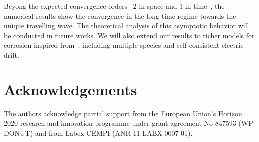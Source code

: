 \documentclass{amsart}
\begin{document}
Beyong the expected convergence orders --$2$ in space and $1$ in time--, the numerical results show the convergence in the long-time regime towards the unique travelling wave. The theoretical analysis of this asymptotic behavior will be conducted in future works. 
We will also extend our results  to richer models for corrosion inspired from~\cite{Bataillon_elec}, including multiple species and self-consistent electric drift. 

\section*{Acknowledgements} The authors acknowledge partial support from the  European Union’s Horizon 2020 research and
innovation programme under grant agreement No 847593 (WP DONUT) and from Labex CEMPI (ANR-11-LABX-0007-01).



\end{document}

